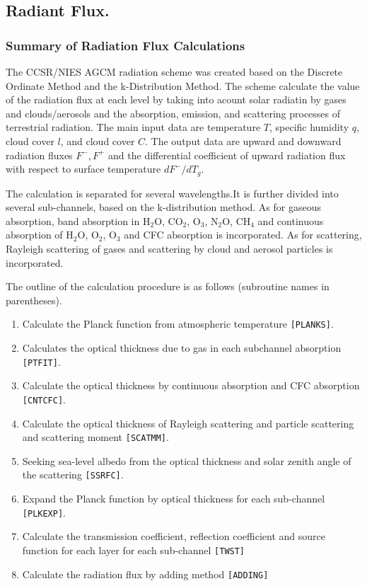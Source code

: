 \hypertarget{radiant-flux.}{%
\subsection{Radiant Flux.}\label{radiant-flux.}}

\hypertarget{summary-of-radiation-flux-calculations}{%
\subsubsection{Summary of Radiation Flux
Calculations}\label{summary-of-radiation-flux-calculations}}

The CCSR/NIES AGCM radiation scheme was created based on the Discrete Ordinate Method and the k-Distribution Method. The scheme calculate the value of the radiation flux at each level by taking into acount solar radiatin by gases and clouds/aerosols and the absorption, emission, and scattering processes of terrestrial radiation. The main input data are temperature \(T\), specific humidity \(q\), cloud cover \(l\), and cloud cover \(C\). The output data are upward and downward radiation fluxes \(F^-, F^+\) and the differential coefficient of upward radiation flux with respect to surface temperature \(dF^-/dT_g\).

The calculation is separated for several wavelengths.It is further divided into several sub-channels, based on the k-distribution method. As for gaseous absorption, band absorption in H\(_2\)O, CO\(_2\), O\(_3\), N\(_2\)O, CH\(_4\) and continuous absorption of H\(_2\)O, O\(_2\), O\(_3\) and CFC absorption is incorporated. As for scattering, Rayleigh scattering of gases and scattering by cloud and aerosol particles is incorporated.

The outline of the calculation procedure is as follows (subroutine names
in parentheses).

\begin{enumerate}
\def\labelenumi{\arabic{enumi}.}
\item
  Calculate the Planck function from atmospheric temperature
  \texttt{{[}PLANKS{]}}.
\item
  Calculates the optical thickness due to gas in each subchannel
  absorption \texttt{{[}PTFIT{]}}.
\item
  Calculate the optical thickness by continuous absorption and CFC absorption \texttt{{[}CNTCFC{]}}.
\item
   Calculate the optical thickness of Rayleigh scattering and particle scattering and scattering moment \texttt{{[}SCATMM{]}}.
\item
  Seeking sea-level albedo from the optical thickness and solar zenith angle of the scattering \texttt{{[}SSRFC{]}}.
\item
  Expand the Planck function by optical thickness for each sub-channel
  \texttt{{[}PLKEXP{]}}.
\item
  Calculate the transmission coefficient, reflection coefficient and source function for each layer for each sub-channel
  \texttt{{[}TWST{]}}
\item
  Calculate the radiation flux by adding method
  \texttt{{[}ADDING{]}}
\end{enumerate}

